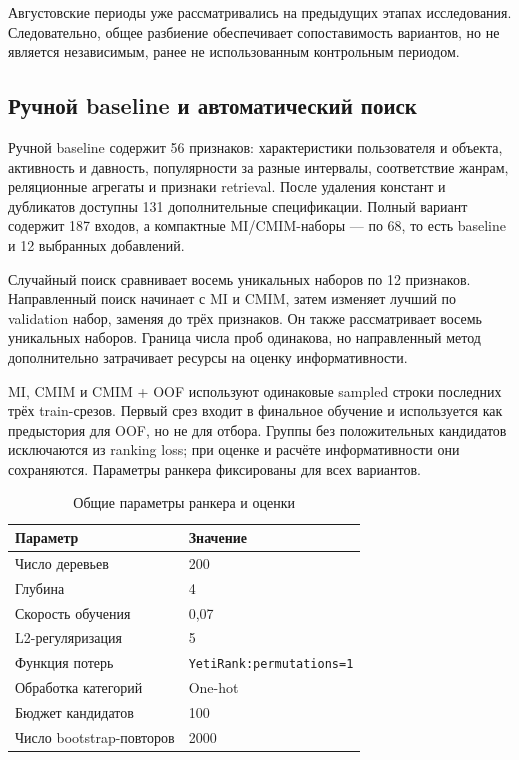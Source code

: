 \documentclass[12pt,a4paper]{article}
\newcommand{\code}[1]{\nolinkurl{#1}}
\begin{document}
Августовские периоды уже рассматривались на предыдущих этапах исследования.
Следовательно, общее разбиение обеспечивает сопоставимость вариантов,
но не является независимым, ранее не использованным контрольным периодом.

\subsection{Ручной baseline и автоматический поиск}
Ручной baseline содержит 56 признаков: характеристики пользователя и
объекта, активность и давность, популярности за разные интервалы,
соответствие жанрам, реляционные агрегаты и признаки retrieval.
После удаления констант и дубликатов доступны 131 дополнительные
спецификации. Полный вариант содержит 187 входов, а компактные
MI/CMIM-наборы — по 68, то есть baseline и 12 выбранных добавлений.

Случайный поиск сравнивает восемь уникальных наборов по 12 признаков.
Направленный поиск начинает с MI и CMIM, затем изменяет лучший по
validation набор, заменяя до трёх признаков. Он также рассматривает восемь
уникальных наборов. Граница числа проб одинакова, но направленный метод
дополнительно затрачивает ресурсы на оценку информативности.

MI, CMIM и CMIM + OOF используют одинаковые sampled строки последних трёх
train-срезов. Первый срез входит в финальное обучение и используется как
предыстория для OOF, но не для отбора. Группы без положительных кандидатов
исключаются из ranking loss; при оценке и расчёте информативности они
сохраняются. Параметры ранкера фиксированы для всех вариантов.
\begin{table}[H]
\centering
\small
\caption{Общие параметры ранкера и оценки}\label{tab:params}
\begin{tabular}{ll}\toprule
Параметр & Значение \\ \midrule
Число деревьев & 200 \\
Глубина & 4 \\
Скорость обучения & 0,07 \\
L2-регуляризация & 5 \\
Функция потерь & \code{YetiRank:permutations=1} \\
Обработка категорий & One-hot \\
Бюджет кандидатов & 100 \\
Число bootstrap-повторов & 2000 \\
\bottomrule
\end{tabular}
\end{table}
\end{document}
